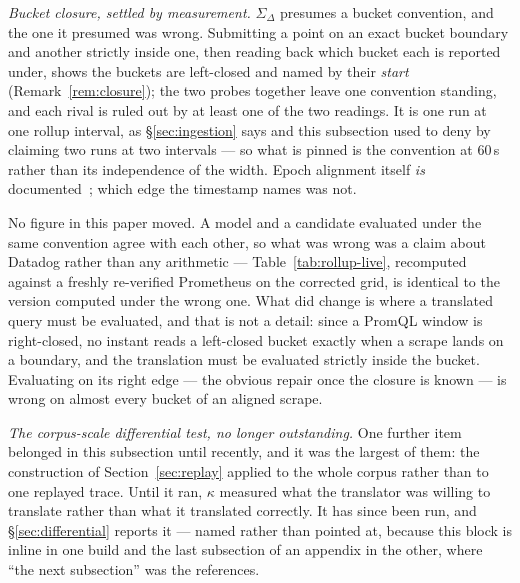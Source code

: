\emph{Bucket closure, settled by measurement.} $\Sigma_\Delta$ presumes a bucket
convention, and the one it presumed was wrong. Submitting a point on an exact bucket
boundary and another strictly inside one, then reading back which bucket each is reported
under, shows the buckets are left-closed and named by their \emph{start}
(Remark~\ref{rem:closure}); the two probes together leave one convention standing, and
each rival is ruled out by at least one of the two readings. It is one run at one rollup
interval, as \S\ref{sec:ingestion} says and this subsection used to deny by claiming two
runs at two intervals --- so what is pinned is the convention at $60$\,s rather than its
independence of the width. Epoch alignment itself \emph{is}
documented~\citep{ddrollup}; which edge the timestamp names was not.

No figure in this paper moved. A model and a candidate evaluated under the same
convention agree with each other, so what was wrong was a claim about Datadog rather than
any arithmetic --- Table~\ref{tab:rollup-live}, recomputed against a freshly re-verified
Prometheus on the corrected grid, is identical to the version computed under the wrong
one. What did change is where a translated query must be evaluated, and that is not a
detail: since a PromQL window is right-closed, no instant reads a left-closed bucket
exactly when a scrape lands on a boundary, and the translation must be evaluated strictly
inside the bucket. Evaluating on its right edge --- the obvious repair once the closure is
known --- is wrong on almost every bucket of an aligned scrape.

\emph{The corpus-scale differential test, no longer outstanding.} One further item
belonged in this subsection until recently, and it was the largest of them: the
construction of Section~\ref{sec:replay} applied to the whole corpus rather than to one
replayed trace. Until it ran, $\kappa$ measured what the translator was willing to
translate rather than what it translated correctly. It has since been run, and
\S\ref{sec:differential} reports it --- named rather than pointed at, because this
block is inline in one build and the last subsection of an appendix in the other,
where ``the next subsection'' was the references.

